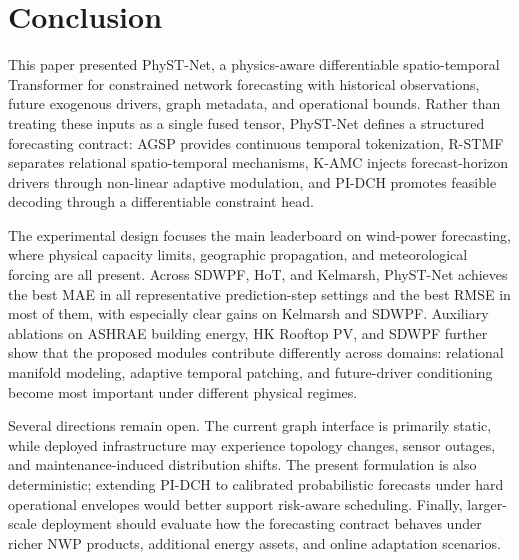 \section{Conclusion}
\label{sec:conclusion}

This paper presented PhyST-Net, a physics-aware differentiable spatio-temporal Transformer for constrained network forecasting with historical observations, future exogenous drivers, graph metadata, and operational bounds. Rather than treating these inputs as a single fused tensor, PhyST-Net defines a structured forecasting contract: AGSP provides continuous temporal tokenization, R-STMF separates relational spatio-temporal mechanisms, K-AMC injects forecast-horizon drivers through non-linear adaptive modulation, and PI-DCH promotes feasible decoding through a differentiable constraint head.

The experimental design focuses the main leaderboard on wind-power forecasting, where physical capacity limits, geographic propagation, and meteorological forcing are all present. Across SDWPF, HoT, and Kelmarsh, PhyST-Net achieves the best MAE in all representative prediction-step settings and the best RMSE in most of them, with especially clear gains on Kelmarsh and SDWPF. Auxiliary ablations on ASHRAE building energy, HK Rooftop PV, and SDWPF further show that the proposed modules contribute differently across domains: relational manifold modeling, adaptive temporal patching, and future-driver conditioning become most important under different physical regimes.

Several directions remain open. The current graph interface is primarily static, while deployed infrastructure may experience topology changes, sensor outages, and maintenance-induced distribution shifts. The present formulation is also deterministic; extending PI-DCH to calibrated probabilistic forecasts under hard operational envelopes would better support risk-aware scheduling. Finally, larger-scale deployment should evaluate how the forecasting contract behaves under richer NWP products, additional energy assets, and online adaptation scenarios.
